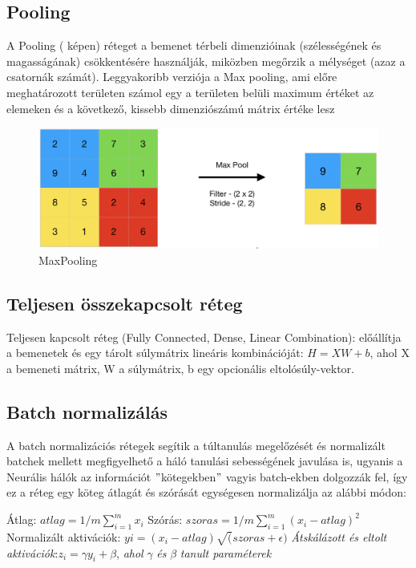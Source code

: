 \documentclass[12pt,oneside,a4paper]{article}
\theoremstyle{remark}
\begin{document}
\subsection{Pooling}\label{subsec:pooling}
A Pooling  ( képen) réteget a bemenet térbeli dimenzióinak (szélességének és magasságának)
csökkentésére használják,
miközben megőrzik a mélységet (azaz a csatornák számát). \newline
Leggyakoribb verziója a Max pooling, ami előre meghatározott területen számol egy a területen belüli maximum értéket az
elemeken és a következő, kissebb dimenziószámú mátrix értéke lesz

\begin{figure}[h]
\centering
\includegraphics[width=0.75\linewidth]{Screenshot-2019-07-21-at-2.57.13-AM}
\caption{\label{fig:Pooling}MaxPooling}
\end{figure}

\subsection{Teljesen összekapcsolt réteg}\label{subsec:teljesen-osszekapcsolt-reteg}

Teljesen kapcsolt réteg (Fully Connected, Dense, Linear Combination): előállítja a bemenetek és egy tárolt
súlymátrix lineáris kombinációját:
 $H=XW+b$, ahol X a bemeneti mátrix, W a súlymátrix, b egy opcionális eltolósúly-vektor.

\subsection{Batch normalizálás}\label{subsec:batch-normalizalas}

A batch normalizációs rétegek segítik a túltanulás megelőzését és normalizált batchek mellett megfigyelhető a háló
tanulási sebességének javulása is, ugyanis a Neurális hálók az információt \("\)kötegekben\("\) vagyis batch-ekben dolgozzák fel,
így ez a réteg egy köteg átlagát és szórását egységesen normalizálja az alábbi módon:

\noindent Átlag: $atlag = 1/m \displaystyle\sum_{i=1}^{m} x_i$  \newline
Szórás: $szoras = 1/m \displaystyle\sum_{i=1}^{m} (x_i - atlag)^2 $\newline
Normalizált aktivációk: $yi = (x_i - atlag) \sqrt(szoras + \epsilon)$ \newline
\newline
\textit{Átskálázott és eltolt aktivációk}:$ z_i = \gamma y_i + \beta $,
\textit{ahol} $\gamma$ \textit{és} $\beta$  \textit{tanult paraméterek}
\newpage
\end{document}
